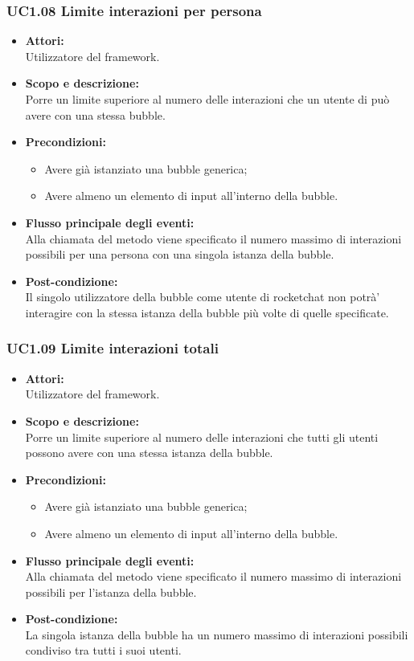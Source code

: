 \subsubsection{UC1.08 Limite interazioni per persona} \label{UC1.08}

\begin{itemize}
	\item \textbf{Attori:}
	\\Utilizzatore del framework.
	\item \textbf{Scopo e descrizione:} 
	\\Porre un limite superiore al numero delle interazioni che un utente di  può avere con una stessa bubble.
	\item \textbf{Precondizioni:}
	\begin{itemize}
		\item Avere già istanziato una bubble generica;
		\item Avere almeno un elemento di input all'interno della bubble.
	\end{itemize}
	\item \textbf{Flusso principale degli eventi:}
	\\Alla chiamata del metodo viene specificato il numero massimo di interazioni possibili per una persona con una singola istanza della bubble.
	\item \textbf{Post-condizione:}
	\\Il singolo utilizzatore della bubble come utente di rocketchat non potrà’ interagire con la stessa istanza della bubble più volte di quelle specificate.
\end{itemize}

\subsubsection{UC1.09 Limite interazioni totali} \label{UC1.09}

\begin{itemize}
	\item \textbf{Attori:}
	\\Utilizzatore del framework.
	\item \textbf{Scopo e descrizione:} 
	\\Porre un limite superiore al numero delle interazioni che tutti gli utenti possono avere con una stessa istanza della bubble.
	\item \textbf{Precondizioni:}
	\begin{itemize}
		\item Avere già istanziato una bubble generica;
		\item Avere almeno un elemento di input all'interno della bubble.
	\end{itemize}
	\item \textbf{Flusso principale degli eventi:}
	\\Alla chiamata del metodo viene specificato il numero massimo di interazioni possibili per l’istanza della bubble.
	\item \textbf{Post-condizione:}
	\\La singola istanza della bubble ha un numero massimo di interazioni possibili condiviso tra tutti i suoi utenti. 
\end{itemize}

